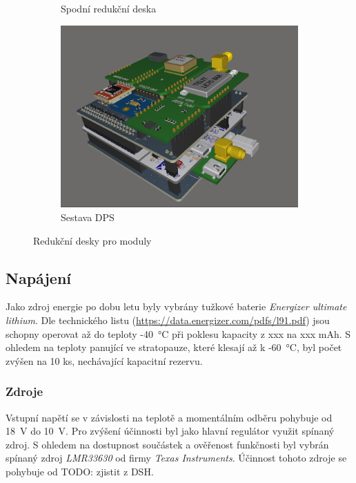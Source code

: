 \documentclass[twoside]{ctuthesis}
\theoremstyle{plain}
\theoremstyle{definition}
\theoremstyle{note}
\begin{document}
\begin{figure}[hbtp]
\begin{subfigure}{.3\textwidth}
				\caption{Spodní redukční deska}
				\label{fig:shield:bot}
			\end{subfigure}
			\begin{subfigure}{.3\textwidth}
				\centering
				\includegraphics[height=0.7\linewidth]{Figures/shield_assembly.png}
				\caption{Sestava DPS}
				\label{fig:shield:assembly}
			\end{subfigure}
			\caption{Redukční desky pro moduly}
			\label{fig:shields:DPS}
		\end{figure}



		
		\subsection{Napájení}
		Jako zdroj energie po dobu letu byly vybrány tužkové baterie \textit{Energizer ultimate lithium}. Dle technického listu (\url{https://data.energizer.com/pdfs/l91.pdf}) jsou schopny operovat až do teploty -40~°C při poklesu kapacity z xxx na xxx mAh. S ohledem na teploty panující ve stratopauze, které klesají až k -60~°C, byl počet zvýšen na 10 ks, nechávající kapacitní rezervu. 

			\subsubsection{Zdroje}
			Vstupní napětí se v závislosti na teplotě a momentálním odběru pohybuje od 18~V do 10~V. Pro zvýšení účinnosti byl jako hlavní regulátor využit spínaný zdroj. S ohledem na dostupnost součástek a ověřenost funkčnosti byl vybrán spínaný zdroj \textit{LMR33630} od firmy \textit{Texas Instruments}. Účinnost tohoto zdroje se pohybuje od TODO: zjistit z DSH. 
\end{document}

